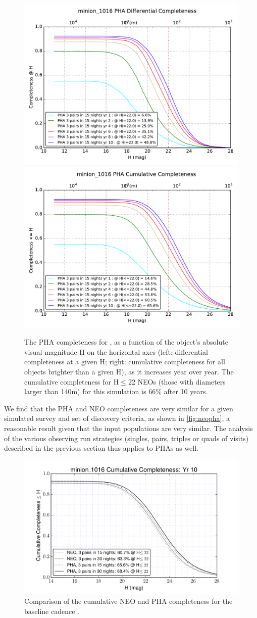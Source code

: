 \begin{figure}[th]
\includegraphics[angle=0,width=0.49\hsize:,clip]{figs/solarsystem/minion_1016_DifferentialCompleteness_PHA_3_pairs_in_15_nights_Years_1_to_10_MOOB_ComboMetricVsH}
\includegraphics[angle=0,width=0.49\hsize:,clip]{figs/solarsystem/minion_1016_CumulativeCompleteness_PHA_3_pairs_in_15_nights_Years_1_to_10_MOOB_ComboMetricVsH}
\caption{The PHA completeness for , as a function of the object's absolute
visual magnitude H on the horizontal axes (left: differential completeness at a given H;
right: cumulative completeness for all objects brighter than a given H), as it increases year over year.
The cumulative completeness for H$\le$22 NEOs (those with diameters larger than 140m)  for this
simulation is 66\% after 10 years.}
\label{fig:baselinePHA}
\end{figure}

We find that the PHA and NEO completeness are very similar for a given simulated survey and set of discovery criteria, as shown in \autoref{fig:neopha},
a reasonable result given that the input populations are very similar.
The analysis of the various observing run strategies (singles, pairs, triples or quads of visits) described in the previous section thus applies to PHAs as well.

\begin{figure}[bh]
\includegraphics[angle=0,width=0.49\hsize:,clip]{figs/solarsystem/minion_1016_CumulativeCompleteness_NEO_and_PHA_Cumulative_Completeness}
\caption{%
Comparison of the cumulative NEO and PHA completeness for the baseline cadence
.}
\label{fig:neopha}
\end{figure}

